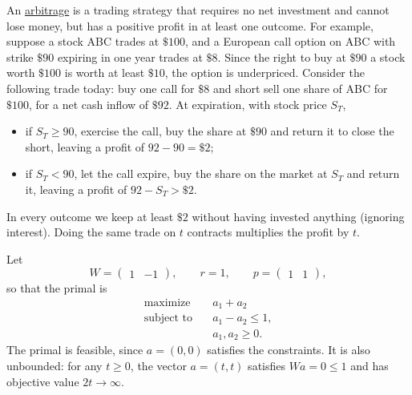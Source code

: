 	\begin{example}
	  \label{ex:primal-feasible-dual-infeasible}
		An \hyperref[qf-def:arbitrage_portfolio]{arbitrage} is a trading strategy that requires no net investment and cannot lose money, but has a positive profit in at least one outcome. For example, suppose a stock ABC trades at $\$100$, and a European call option on ABC with strike $\$90$ expiring in one year trades at $\$8$. Since the right to buy at $\$90$ a stock worth $\$100$ is worth at least $\$10$, the option is underpriced. Consider the following trade today: buy one call for $\$8$ and short sell one share of ABC for $\$100$, for a net cash inflow of $\$92$. At expiration, with stock price $S_T$, 
		\begin{itemize}
			\item if $S_T \geq 90$, exercise the call, buy the share at $\$90$ and return it to close the short, leaving a profit of $92 - 90 = \$2$;
			\item if $S_T < 90$, let the call expire, buy the share on the market at $S_T$ and return it, leaving a profit of $92 - S_T > \$2$.
		\end{itemize}
		In every outcome we keep at least $\$2$ without having invested anything (ignoring interest). Doing the same trade on $t$ contracts multiplies the profit by $t$. 

		Let 
		\begin{equation}
			W = \begin{pmatrix} 1 & -1 \end{pmatrix}, \qquad r = 1, \qquad p = \begin{pmatrix} 1 & 1 \end{pmatrix},
		\end{equation}
		so that the primal is 
		\begin{align}
			\text{maximize} \quad &a_1 + a_2 \\
			\text{subject to} \quad &a_1 - a_2 \leq 1, \\
			&a_1, a_2 \geq 0.
		\end{align}
		The primal is feasible, since $a = (0, 0)$ satisfies the constraints. It is also unbounded: for any $t \geq 0$, the vector $a = (t, t)$ satisfies $Wa = 0 \leq 1$ and has objective value $2t \to \infty$. 


\end{example}

